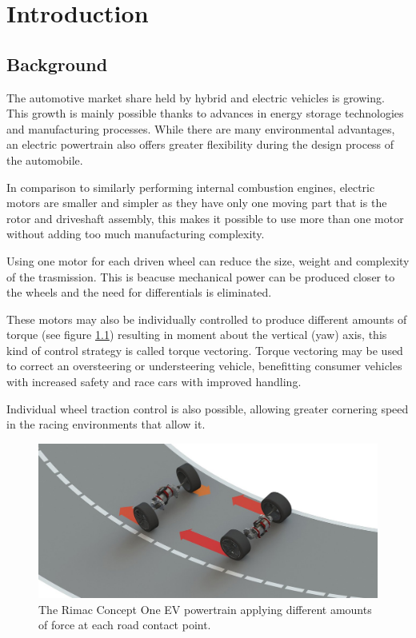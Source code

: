 \chapter{Introduction}
\label{chap:intro}
\section{Background}
\label{sec:background}
The automotive market share held by hybrid and electric vehicles is growing.
This growth is mainly possible thanks to advances in energy storage technologies and manufacturing processes.
While there are many environmental advantages, an electric powertrain also offers greater flexibility during the design process of the automobile.

In comparison to similarly performing internal combustion engines, electric motors are smaller and simpler as they have only one moving part that is the rotor and driveshaft assembly, this makes it possible to use more than one motor without adding too much manufacturing complexity.

Using one motor for each driven wheel can reduce the size, weight and complexity of the trasmission. This is beacuse mechanical power can be produced closer to the wheels and the need for differentials is eliminated.

These motors may also be individually controlled to produce different amounts of torque (see figure \ref{rimac}) resulting in moment about the vertical (yaw) axis, this kind of control strategy is called torque vectoring. Torque vectoring may be used to correct an oversteering or understeering vehicle, benefitting consumer vehicles with increased safety and race cars with improved handling.

Individual wheel traction control is also possible, allowing greater cornering speed in the racing environments that allow it.

\begin{figure}[tb]
  \centering
  \includegraphics[width=\textwidth]{images/rimac.jpg}
  \caption{The Rimac Concept One EV powertrain applying different amounts of force at each road contact point.}
  \label{rimac}
\end{figure}

